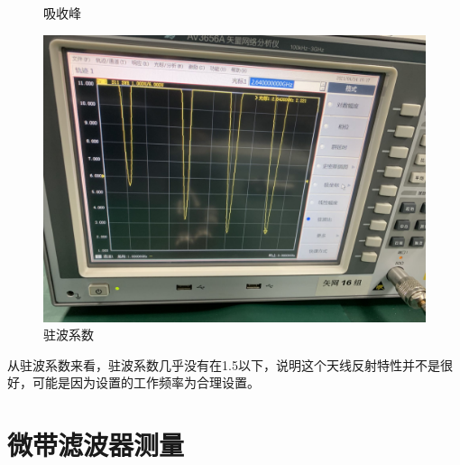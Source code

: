 \documentclass{../source/Experiment}
\begin{document}
\begin{figure}[H]
\begin{minipage}[t]{0.3\textwidth}
                \caption{吸收峰}
            \end{minipage}
            \begin{minipage}[t]{0.3\textwidth}
                \centering
                \includegraphics[width=1\textwidth]{pic/驻波系数}
                \caption{驻波系数}
            \end{minipage}
        \end{figure}

        从驻波系数来看，驻波系数几乎没有在1.5以下，说明这个天线反射特性并不是很好，可能是因为设置的工作频率为合理设置。

    \section{微带滤波器测量}
\end{document}
